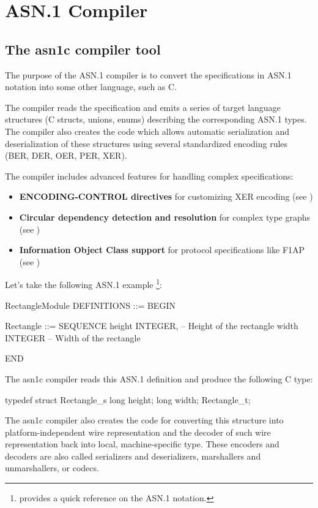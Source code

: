 \documentclass[english,oneside,12pt]{book}
\begin{document}
\chapter{ASN.1 Compiler}

\section{The asn1c compiler tool}

The purpose of the ASN.1 compiler is to convert the specifications
in ASN.1 notation into some other language, such as C.

The compiler reads the specification and emits a series of target
language structures (C structs, unions, enums) describing the corresponding
ASN.1 types. The compiler also creates the code which allows automatic
serialization and deserialization of these structures using several
standardized encoding rules (BER, DER, OER, PER, XER).

The compiler includes advanced features for handling complex specifications:
\begin{itemize}
\item \textbf{ENCODING-CONTROL directives} for customizing XER encoding (see )
\item \textbf{Circular dependency detection and resolution} for complex type graphs (see )
\item \textbf{Information Object Class support} for protocol specifications like F1AP (see )
\end{itemize}

Let's take the following ASN.1 example%
\footnote{ provides a quick reference
on the ASN.1 notation.}:
\begin{asn}
RectangleModule DEFINITIONS ::= BEGIN

Rectangle ::= SEQUENCE {
    height  INTEGER,        -- Height of the rectangle
    width   INTEGER         -- Width of the rectangle
}

END
\end{asn}
The asn1c compiler reads this ASN.1 definition and produce the following
C type:
\begin{codesample}
typedef struct Rectangle_s {
    long height;
    long width;
} Rectangle_t;
\end{codesample}
The asn1c compiler also creates the code for converting this structure into
platform-independent wire representation and the decoder
of such wire representation back into local, machine-specific type.
These encoders and decoders are also called serializers and deserializers,
marshallers and unmarshallers, or codecs.
\end{document}
